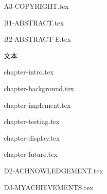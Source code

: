 \documentclass[12pt,openany,a4paper,fancyhdr,oneside]{ctexbook}
\begin{document}






 {A3-COPYRIGHT.tex}






\newpage
{}
\pagestyle{plain}
 {B1-ABSTRACT.tex}


 {B2-ABSTRACT-E.tex}


\clearpage{\pagestyle{plain}\cleardoublepage}
\textcolor[rgb]{1,1,1}{文本} 

\setcounter{tocdepth}{2}
\tableofcontents







%



\newpage
{}
\pagestyle{fancy}



\setlength{\baselineskip}{25pt}  %

 {chapter-intro.tex}



 {chapter-background.tex}




 {chapter-implement.tex}

 {chapter-testing.tex}


 {chapter-display.tex}

 {chapter-future.tex}

\clearpage





\pagestyle{plain}
\clearpage
{}
{}
 {D2-ACHNOWLEDGEMENT.tex}
\pagestyle{plain}


\clearpage
{}
{}
 {D3-MYACHIEVEMENTS.tex}


\printindex
\end{document}
